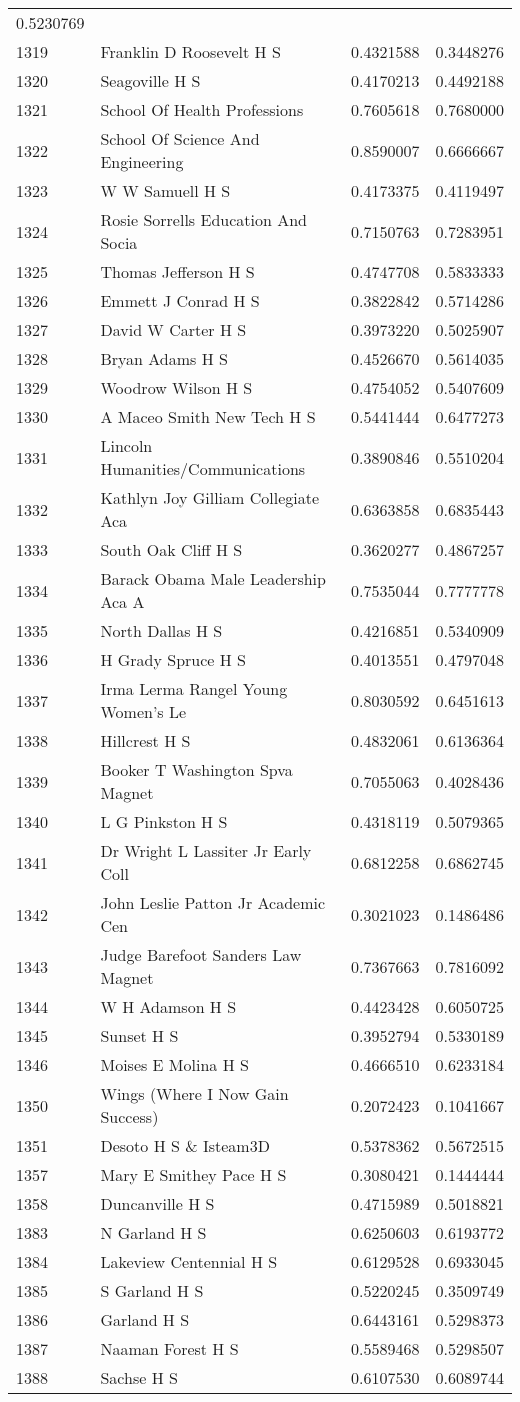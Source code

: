 \documentclass[
]{article}
\begin{document}
\begin{longtable}[]{@{}llrr@{}}
0.5230769\tabularnewline
1319 & Franklin D Roosevelt H S & 0.4321588 & 0.3448276\tabularnewline
1320 & Seagoville H S & 0.4170213 & 0.4492188\tabularnewline
1321 & School Of Health Professions & 0.7605618 &
0.7680000\tabularnewline
1322 & School Of Science And Engineering & 0.8590007 &
0.6666667\tabularnewline
1323 & W W Samuell H S & 0.4173375 & 0.4119497\tabularnewline
1324 & Rosie Sorrells Education And Socia & 0.7150763 &
0.7283951\tabularnewline
1325 & Thomas Jefferson H S & 0.4747708 & 0.5833333\tabularnewline
1326 & Emmett J Conrad H S & 0.3822842 & 0.5714286\tabularnewline
1327 & David W Carter H S & 0.3973220 & 0.5025907\tabularnewline
1328 & Bryan Adams H S & 0.4526670 & 0.5614035\tabularnewline
1329 & Woodrow Wilson H S & 0.4754052 & 0.5407609\tabularnewline
1330 & A Maceo Smith New Tech H S & 0.5441444 & 0.6477273\tabularnewline
1331 & Lincoln Humanities/Communications & 0.3890846 &
0.5510204\tabularnewline
1332 & Kathlyn Joy Gilliam Collegiate Aca & 0.6363858 &
0.6835443\tabularnewline
1333 & South Oak Cliff H S & 0.3620277 & 0.4867257\tabularnewline
1334 & Barack Obama Male Leadership Aca A & 0.7535044 &
0.7777778\tabularnewline
1335 & North Dallas H S & 0.4216851 & 0.5340909\tabularnewline
1336 & H Grady Spruce H S & 0.4013551 & 0.4797048\tabularnewline
1337 & Irma Lerma Rangel Young Women's Le & 0.8030592 &
0.6451613\tabularnewline
1338 & Hillcrest H S & 0.4832061 & 0.6136364\tabularnewline
1339 & Booker T Washington Spva Magnet & 0.7055063 &
0.4028436\tabularnewline
1340 & L G Pinkston H S & 0.4318119 & 0.5079365\tabularnewline
1341 & Dr Wright L Lassiter Jr Early Coll & 0.6812258 &
0.6862745\tabularnewline
1342 & John Leslie Patton Jr Academic Cen & 0.3021023 &
0.1486486\tabularnewline
1343 & Judge Barefoot Sanders Law Magnet & 0.7367663 &
0.7816092\tabularnewline
1344 & W H Adamson H S & 0.4423428 & 0.6050725\tabularnewline
1345 & Sunset H S & 0.3952794 & 0.5330189\tabularnewline
1346 & Moises E Molina H S & 0.4666510 & 0.6233184\tabularnewline
1350 & Wings (Where I Now Gain Success) & 0.2072423 &
0.1041667\tabularnewline
1351 & Desoto H S \& Isteam3D & 0.5378362 & 0.5672515\tabularnewline
1357 & Mary E Smithey Pace H S & 0.3080421 & 0.1444444\tabularnewline
1358 & Duncanville H S & 0.4715989 & 0.5018821\tabularnewline
1383 & N Garland H S & 0.6250603 & 0.6193772\tabularnewline
1384 & Lakeview Centennial H S & 0.6129528 & 0.6933045\tabularnewline
1385 & S Garland H S & 0.5220245 & 0.3509749\tabularnewline
1386 & Garland H S & 0.6443161 & 0.5298373\tabularnewline
1387 & Naaman Forest H S & 0.5589468 & 0.5298507\tabularnewline
1388 & Sachse H S & 0.6107530 & 0.6089744\tabularnewline

\end{longtable}
\end{document}

